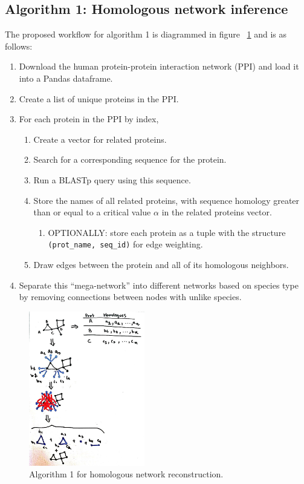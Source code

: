 \documentclass{acmsiggraph}               %
\begin{document}
\subsection{Algorithm 1: Homologous network inference}

The proposed workflow for algorithm 1 is diagrammed in figure ~\ref{fig:algo1} and is as follows:

\begin{enumerate}
    \item Download the human protein-protein interaction network (PPI) and load it into a Pandas dataframe.
    \item Create a list of unique proteins in the PPI.
    \item For each protein in the PPI by index,
    \begin{enumerate}
        \item Create a vector for related proteins. 
        \item Search for a corresponding sequence for the protein.
        \item Run a BLASTp query using this sequence. 
        \item Store the names of all related proteins, with sequence homology greater than or equal to a critical value \(\alpha\) in the related proteins vector. 
        \begin{enumerate}
            \item OPTIONALLY: store each protein as a tuple with the structure \texttt{(prot\_name, seq\_id)} for edge weighting.
        \end{enumerate}
        \item Draw edges between the protein and all of its homologous neighbors.
    \end{enumerate}
    \item Separate this ``mega-network'' into different networks based on species type by removing connections between nodes with unlike species.
\end{enumerate}

\begin{figure}
    \begin{center}
        \includegraphics[width=0.45\textwidth]{images/algo_1.jpg}
    \end{center}
    \caption{Algorithm 1 for homologous network reconstruction.}
    \label{fig:algo1}
\end{figure}
\end{document}
